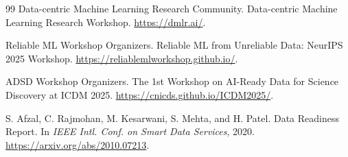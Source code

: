 \documentclass[10pt]{article}
\begin{document}
\begin{thebibliography}{99}
Data-centric Machine Learning Research Community.
\newblock Data-centric Machine Learning Research Workshop.
\newblock \url{https://dmlr.ai/}.

Reliable ML Workshop Organizers.
\newblock Reliable ML from Unreliable Data: NeurIPS 2025 Workshop.
\newblock \url{https://reliablemlworkshop.github.io/}.

ADSD Workshop Organizers.
\newblock The 1st Workshop on AI-Ready Data for Science Discovery at ICDM 2025.
\newblock \url{https://cnicds.github.io/ICDM2025/}.

S. Afzal, C. Rajmohan, M. Kesarwani, S. Mehta, and H. Patel.
\newblock Data Readiness Report.
\newblock In \emph{IEEE Intl. Conf. on Smart Data Services}, 2020. \url{https://arxiv.org/abs/2010.07213}.

\end{thebibliography}
\end{document}
